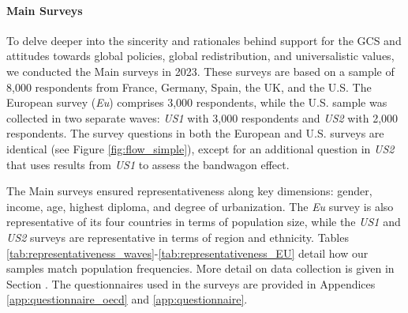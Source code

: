 \paragraph{Main Surveys}\label{par:surveys}

To delve deeper into the sincerity and rationales behind support for the GCS and attitudes towards global policies, global redistribution, and universalistic values, we conducted the Main surveys in 2023. These surveys are based on a sample of 8,000 respondents from France, Germany, Spain, the UK, and the U.S. The European survey (\textit{Eu}) comprises 3,000 respondents, while the U.S. sample was collected in two separate waves: \textit{US1} with 3,000 respondents and \textit{US2} with 2,000 respondents. The survey questions in both the European and U.S. surveys are identical (see Figure \ref{fig:flow_simple}), except for an additional question in \textit{US2} that uses results from \textit{US1} to assess the bandwagon effect.

The Main surveys ensured representativeness along key dimensions: gender, income, age, highest diploma, and degree of urbanization. The \textit{Eu} survey is also representative of its four countries in terms of population size, while the \textit{US1} and \textit{US2} surveys are representative in terms of region and ethnicity. 
Tables \ref{tab:representativeness_waves}-\ref{tab:representativeness_EU} detail how our samples match population frequencies. 
More detail on data collection is given in Section . The questionnaires used in the surveys are provided in Appendices \ref{app:questionnaire_oecd} and \ref{app:questionnaire}.





